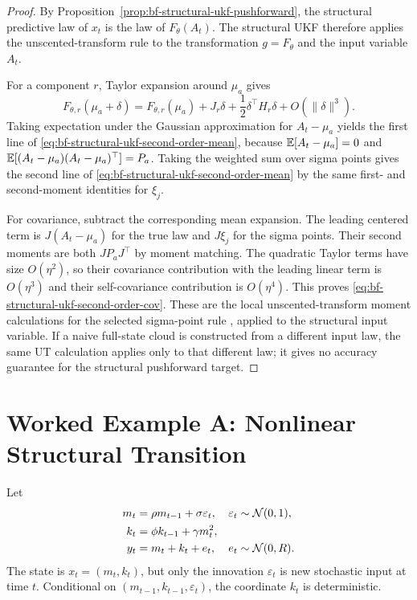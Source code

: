 \begin{proof}
By Proposition~\ref{prop:bf-structural-ukf-pushforward}, the structural
predictive law of $x_t$ is the law of $F_\theta(A_t)$.  The structural UKF
therefore applies the unscented-transform rule to the transformation
$g=F_\theta$ and the input variable $A_t$.

For a component $r$, Taylor expansion around $\mu_a$ gives
\[
  F_{\theta,r}(\mu_a+\delta)
  =
  F_{\theta,r}(\mu_a)
  +J_r\delta
  +\frac{1}{2}\delta^\top H_r\delta
  +O(\|\delta\|^3).
\]
Taking expectation under the Gaussian approximation for
$A_t-\mu_a$ yields the first line of
\eqref{eq:bf-structural-ukf-second-order-mean}, because
$\mathbb{E}[A_t-\mu_a]=0$ and
$\mathbb{E}[(A_t-\mu_a)(A_t-\mu_a)^\top]=P_a$.  Taking the weighted sum over sigma
points gives the second line of
\eqref{eq:bf-structural-ukf-second-order-mean} by the same first- and
second-moment identities for $\xi_j$.

For covariance, subtract the corresponding mean expansion.  The leading
centered term is $J(A_t-\mu_a)$ for the true law and $J\xi_j$ for the sigma
points.  Their second moments are both $JP_aJ^\top$ by moment matching.  The
quadratic Taylor terms have size $O(\eta^2)$, so their covariance contribution
with the leading linear term is $O(\eta^3)$ and their self-covariance
contribution is $O(\eta^4)$.  This proves
\eqref{eq:bf-structural-ukf-second-order-cov}.  These are the local
unscented-transform moment calculations for the selected sigma-point rule
\citep{julier1996general,vandermerwe2004sigma}, applied to the structural
input variable.  If a naive full-state cloud is constructed from a different
input law, the same UT calculation applies only to that different law; it gives
no accuracy guarantee for the structural pushforward target.
\end{proof}

\section{Worked Example A: Nonlinear Structural Transition}
\label{sec:bf-nonlinear-structural-transition-example}

Let
\begin{align}
  m_t &= \rho m_{t-1}+\sigma\varepsilon_t,
    & \varepsilon_t &\sim \mathcal{N}(0,1), \label{eq:bf-ukf-example-m}\\
  k_t &= \phi k_{t-1}+\gamma m_t^2, \label{eq:bf-ukf-example-k}\\
  y_t &= m_t+k_t+e_t,
    & e_t &\sim \mathcal{N}(0,R). \label{eq:bf-ukf-example-y}
\end{align}
The state is $x_t=(m_t,k_t)$, but only the innovation
$\varepsilon_t$ is new stochastic input at time $t$.  Conditional on
$(m_{t-1},k_{t-1},\varepsilon_t)$, the coordinate $k_t$ is deterministic.

